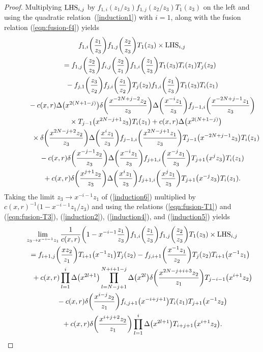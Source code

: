 \documentclass[pdftex]{sigma}
\numberwithin{equation}{section}
\begin{document}
\begin{proof}
Multiplying ${\rm LHS}_{i,j}$ by
$f_{1,i}(z_1/z_3)f_{1,j}(z_2/z_3)T_1(z_3)$
on the left and using the quadratic rela\-tion~(\ref{induction1}) with $i=1$,
along with the fusion relation (\ref{eqn:fusion-f4}) yields
\begin{gather}
f_{1,i}\bigg(\frac{z_1}{z_3}\bigg)
f_{1,j}\bigg(\frac{z_2}{z_3}\bigg)T_1(z_3)
\times {\rm LHS}_{i, j}\notag
\\ \qquad
{}=f_{1,j}\bigg(\frac{z_2}{z_3}\bigg)
f_{i,j}\bigg(\frac{z_2}{z_1}\bigg)
f_{1,i}\bigg(\frac{z_1}{z_3}\bigg)T_1(z_3)T_i(z_1)T_j(z_2)\notag
\\ \qquad\hphantom{=}
{}-f_{j,1}\bigg(\frac{z_3}{z_2}\bigg)
f_{j,i}\bigg(\frac{z_1}{z_2}\bigg)T_j(z_2)
f_{1,i}\bigg(\frac{z_1}{z_3}\bigg)T_1(z_3)T_i(z_1)\notag
\\ \qquad\hphantom{=}
{}-c(x,r)\Delta\big(x^{2(N+1-j)}\big)
\delta\bigg(\frac{x^{-2N+j-2}z_2}{z_3}\bigg)
\Delta\bigg(\frac{x^{-i}z_1}{z_3}\bigg)
f_{j-1,i}\bigg(\frac{x^{-2N+j-1}z_1}{z_3}\bigg)\notag
\\ \qquad\hphantom{=-}
{}\times T_{j-1}\big(x^{2N-j+1}z_3\big)T_i(z_1)
+c(x,r)\Delta\big(x^{2(N+1-j)}\big)\notag
\\ \qquad\hphantom{=-}
{}\times\delta\bigg(\frac{x^{2N-j+2}z_2}{z_3}\bigg)
\Delta\bigg(\frac{x^{i}z_1}{z_3}\bigg)
f_{j-1,i}\bigg(\frac{x^{2N-j+1}z_1}{z_3}\bigg)
T_{j-1}\big(x^{-2N+j-1}z_3\big)T_i(z_1)\notag
\\ \qquad\hphantom{=}
{}-c(x,r)\delta\bigg(\frac{x^{-j-1}z_2}{z_3}\bigg)
\Delta\bigg(\frac{x^{-i}z_1}{z_3}\bigg)f_{j+1,i} \bigg(\frac{x^{-j}z_1}{z_3}\bigg)T_{j+1}\big(x^jz_3\big)T_i(z_1)\notag
\\ \qquad\hphantom{=}
{}+c(x,r)\delta\bigg(\frac{x^{j+1}z_2}{z_3}\bigg)
\Delta\bigg(\frac{x^{i}z_1}{z_3}\bigg)
f_{j+1,i}\bigg(\frac{x^{j}z_1}{z_3}\bigg)T_{j+1}\big(x^{-j}z_3\big)T_i(z_1).
\label{induction6}
\end{gather}
Taking the limit $z_3\to x^{-i-1}z_1$ of (\ref{induction6}) multiplied by
$c(x,r)^{-1} \big(1-x^{-i-1}z_1/z_3\big)$ and using the relations
(\ref{eqn:fusion-T1}) and (\ref{eqn:fusion-T3}),
(\ref{induction2}), (\ref{induction4}), and (\ref{induction5}) yields
\begin{gather}
\lim_{z_3 \to x^{-i-1}z_1}\frac{1}{c(x,r)}\bigg(1-x^{-i-1}\frac{z_1}{z_3}\bigg)
f_{1,i}\bigg(\frac{z_1}{z_3}\bigg)f_{1,j}\bigg(\frac{z_2}{z_3}\bigg)T_1(z_3)
\times {\rm LHS}_{i, j}\notag
\\ \qquad
{}=f_{i+1,j}\bigg(\frac{xz_2}{z_1}\bigg)T_{i+1}\big(x^{-1}z_1\big)T_j(z_2)-
f_{j,i+1}\bigg(\frac{x^{-1}z_1}{z_2}\bigg)T_j(z_2)T_{i+1}\big(x^{-1}z_1\big)\notag
\\ \qquad\hphantom{=}
{}+c(x,r) \prod_{l=1}^i \Delta\big(x^{2l+1}\big)\prod_{l=N-j+1}^{N+i+1-j}
\Delta\big(x^{2l}\big)\delta\bigg(\frac{x^{2N-j+i+3}z_2}{z_1}\bigg)T_{j-i-1}\big(x^{i+1}z_2\big)\notag
\\ \qquad\hphantom{=}
{}-c(x,r)\delta\bigg(\frac{x^{i-j}z_2}{z_1}\bigg)
f_{i,j+1}\big(x^{-i+j+1}\big)T_i(z_1)T_{j+1}\big(x^{-1}z_2\big)\notag
\\ \qquad\hphantom{=}
{}+c(x,r)\delta\bigg(\frac{x^{i+j+2}z_2}{z_1}\bigg)\prod_{l=1}^{i}
\Delta\big(x^{2l+1}\big)T_{i+j+1}\big(x^{i+1}z_2\big).
\label{induction7}
\end{gather}


\end{proof}
\end{document}
